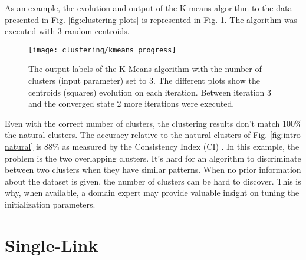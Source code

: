 

As an example, the evolution and output of the K-means algorithm to the data presented in Fig. \ref{fig:clustering plots} is represented in Fig. \ref{fig:intro kmeans}.
The algorithm was executed with 3 random centroids.

\begin{figure}[hbtp]
    \centering
    \texttt{[image: clustering/kmeans\_progress]}
    \caption{The output labels of the K-Means algorithm with the number of clusters (input parameter) set to 3. The different plots show the centroids (squares) evolution on each iteration. Between iteration 3 and the converged state 2 more iterations were executed.}
    \label{fig:intro kmeans}
\end{figure}

Even with the correct number of clusters, the clustering results don't match $100\%$ the natural clusters.
The accuracy relative to the natural clusters of Fig. \ref{fig:intro natural} is $88\%$ as measured by the Consistency Index (CI) \cite{Fred2001}.
In this example, the problem is the two overlapping clusters.
It's hard for an algorithm to discriminate between two clusters when they have similar patterns.
When no prior information about the dataset is given, the number of clusters can be hard to discover.
This is why, when available, a domain expert may provide valuable insight on tuning the initialization parameters.

\section{Single-Link}
\label{sec:sl}

